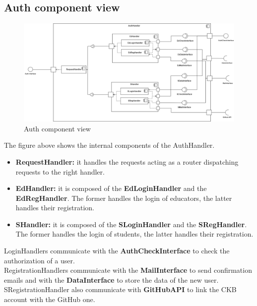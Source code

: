 \subsection{Auth component view}
\begin{figure}[H]
    \centering
    \includegraphics[width=\textwidth]{images/component_view/Auth.png}
    \caption{Auth component view}
\end{figure}
The figure above shows the internal components of the AuthHandler.
\begin{itemize}
    \item \textbf{RequestHandler: } it handles the requests acting as a router dispatching requests to the right handler.
    \item \textbf{EdHandler: } it is composed of the \textbf{EdLoginHandler} and the \textbf{EdRegHandler}. The former handles the login of educators, 
    the latter handles their registration.
    \item \textbf{SHandler: } it is composed of the \textbf{SLoginHandler} and the \textbf{SRegHandler}. The former handles the login of students,
    the latter handles their registration.
\end{itemize}
LoginHandlers communicate with the \textbf{AuthCheckInterface} to check the authorization of a user.\\
RegistrationHandlers communicate with the \textbf{MailInterface} to send confirmation emails and with the \textbf{DataInterface} to store the data of the new user.\\
SRegistrationHandler also communicate with \textbf{GitHubAPI} to link the CKB account with the GitHub one.

